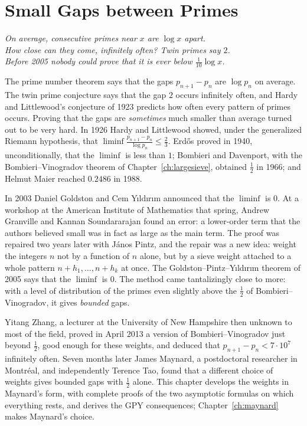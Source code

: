 \chapter{Small Gaps between Primes}\label{ch:gpy}
\begin{center}\itshape
On average, consecutive primes near $x$ are $\log x$ apart.\\
How close can they come, infinitely often? Twin primes say $2$.\\
Before 2005 nobody could prove that it is ever below $\frac1{10}\log x$.
\end{center}

The prime number theorem says that the gaps $p_{n+1}-p_n$ are $\log p_n$ on average. The twin prime conjecture says that the gap $2$ occurs infinitely often, and Hardy and Littlewood's conjecture of 1923 predicts how often every pattern of primes occurs. Proving that the gaps are \emph{sometimes} much smaller than average turned out to be very hard. In 1926 Hardy and Littlewood showed, under the generalized Riemann hypothesis, that $\liminf\frac{p_{n+1}-p_n}{\log p_n}\le\frac23$. Erdős proved in 1940, unconditionally, that the $\liminf$ is less than $1$; Bombieri and Davenport, with the Bombieri--Vinogradov theorem of Chapter~\ref{ch:largesieve}, obtained $\frac12$ in 1966; and Helmut Maier reached $0.2486$ in 1988.

In 2003 Daniel Goldston and Cem Yıldırım announced that the $\liminf$ is $0$. At a workshop at the American Institute of Mathematics that spring, Andrew Granville and Kannan Soundararajan found an error: a lower-order term that the authors believed small was in fact as large as the main term. The proof was repaired two years later with János Pintz, and the repair was a new idea: weight the integers $n$ not by a function of $n$ alone, but by a sieve weight attached to a whole pattern $n+h_1,\dots,n+h_k$ at once. The Goldston--Pintz--Yıldırım theorem of 2005 says that the $\liminf$ is $0$. The method came tantalizingly close to more: with a level of distribution of the primes even slightly above the $\frac12$ of Bombieri--Vinogradov, it gives \emph{bounded} gaps.

Yitang Zhang, a lecturer at the University of New Hampshire then unknown to most of the field, proved in April 2013 a version of Bombieri--Vinogradov just beyond $\frac12$, good enough for these weights, and deduced that $p_{n+1}-p_n<7\cdot10^7$ infinitely often. Seven months later James Maynard, a postdoctoral researcher in Montréal, and independently Terence Tao, found that a different choice of weights gives bounded gaps with $\frac12$ alone. This chapter develops the weights in Maynard's form, with complete proofs of the two asymptotic formulas on which everything rests, and derives the GPY consequences; Chapter~\ref{ch:maynard} makes Maynard's choice.

